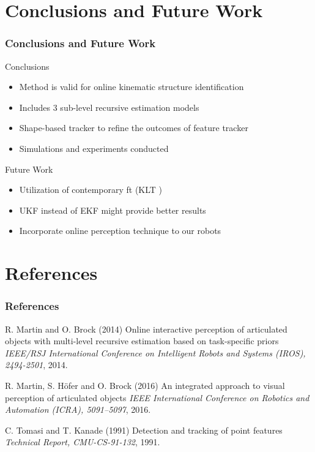 \documentclass{beamer}
\begin{document}
\section{Conclusions and Future Work}

\begin{frame}
\frametitle{Conclusions and Future Work}

Conclusions
\begin{itemize}
\item Method is valid for online kinematic structure identification 
\item Includes 3 sub-level recursive estimation models
\item Shape-based tracker to refine the outcomes of feature tracker 
\item Simulations and experiments conducted

\end{itemize}
\vspace{.4cm}

Future Work
\begin{itemize}
\item Utilization of contemporary ft (KLT \cite{p3})
\item UKF instead of EKF might provide better results
\item Incorporate online perception technique to our robots 
\end{itemize}


\end{frame}



\section{References}
\begin{frame}
\frametitle{References}
\scriptsize{
\begin{thebibliography}{99} %

 R. Martin and O. Brock (2014)
\newblock Online interactive perception of articulated objects with multi-level recursive estimation based on task-specific priors
\newblock \emph{IEEE/RSJ International Conference on Intelligent Robots and Systems (IROS), 2494-2501}, 2014.

 R. Martin, S. H{\"o}fer and O. Brock (2016)
\newblock An integrated approach to visual perception of articulated objects
\newblock \emph{IEEE International Conference on Robotics and Automation (ICRA), 5091--5097}, 2016.

 C. Tomasi and T. Kanade (1991)
\newblock Detection and tracking of point features
\newblock \emph{Technical Report, CMU-CS-91-132}, 1991.


\end{thebibliography}
}
\end{frame}
\end{document}
